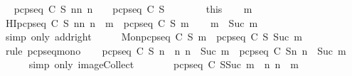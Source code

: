 \begin{isabellebody}
\ \isamarkupfalse%
\ {\isachardoublequoteopen}{\isasymUnion}{\isacharbraceleft}pcp{\isacharunderscore}seq\ C\ S\ n{\isacharbar}n{\isachardot}\ n\ {\isasymle}\ {}{\isacharbraceright}\ {\isacharequal}\ pcp{\isacharunderscore}seq\ C\ S\ {}{\isachardoublequoteclose}\ \isanewline
\ \ \ \ \isamarkupfalse%
\ this\isanewline
{}\isamarkupfalse%
\isanewline
\ \ \isamarkupfalse%
\ m\isanewline
\ \ \isamarkupfalse%
\ HI{\isacharcolon}{\isachardoublequoteopen}{\isasymUnion}{\isacharbraceleft}pcp{\isacharunderscore}seq\ C\ S\ n{\isacharbar}n{\isachardot}\ n\ {\isasymle}\ m{\isacharbraceright}\ {\isacharequal}\ pcp{\isacharunderscore}seq\ C\ S\ m{\isachardoublequoteclose}\isanewline
\ \ \isamarkupfalse%
\ {\isachardoublequoteopen}m\ {\isasymle}\ Suc\ m{\isachardoublequoteclose}\ \isanewline
\ \ \ \ \isamarkupfalse%
\ {\isacharparenleft}simp\ only{\isacharcolon}\ add{\isacharunderscore}{}{\isacharunderscore}right{\isacharparenright}\isanewline
\ \ \isamarkupfalse%
\ \isamarkupfalse%
\ Mon{\isacharcolon}{\isachardoublequoteopen}pcp{\isacharunderscore}seq\ C\ S\ m\ {\isasymsubseteq}\ pcp{\isacharunderscore}seq\ C\ S\ {\isacharparenleft}Suc\ m{\isacharparenright}{\isachardoublequoteclose}\isanewline
\ \ \ \ \isamarkupfalse%
\ {\isacharparenleft}rule\ pcp{\isacharunderscore}seq{\isacharunderscore}mono{\isacharparenright}\isanewline
\ \ \isamarkupfalse%
\ {\isachardoublequoteopen}{\isasymUnion}{\isacharbraceleft}pcp{\isacharunderscore}seq\ C\ S\ n\ {\isacharbar}\ n{\isachardot}\ n\ {\isasymle}\ Suc\ m{\isacharbraceright}\ {\isacharequal}\ {\isasymUnion}{\isacharparenleft}{\isacharparenleft}pcp{\isacharunderscore}seq\ C\ S{\isacharparenright}{\isacharbackquote}{\isacharparenleft}{\isacharbraceleft}n{\isachardot}\ n\ {\isasymle}\ Suc\ m{\isacharbraceright}{\isacharparenright}{\isacharparenright}{\isachardoublequoteclose}\isanewline
\ \ \ \ \isamarkupfalse%
\ {\isacharparenleft}simp\ only{\isacharcolon}\ image{\isacharunderscore}Collect{\isacharparenright}\isanewline
\ \ \isamarkupfalse%
\ \isamarkupfalse%
\ {\isachardoublequoteopen}{\isasymdots}\ {\isacharequal}\ {\isasymUnion}{\isacharparenleft}{\isacharparenleft}pcp{\isacharunderscore}seq\ C\ S{\isacharparenright}{\isacharbackquote}{\isacharparenleft}{\isacharbraceleft}Suc\ m{\isacharbraceright}\ {\isasymunion}\ {\isacharbraceleft}n{\isachardot}\ n\ {\isasymle}\ m{\isacharbraceright}{\isacharparenright}{\isacharparenright}{\isachardoublequoteclose}\isanewline

\end{isabellebody}
